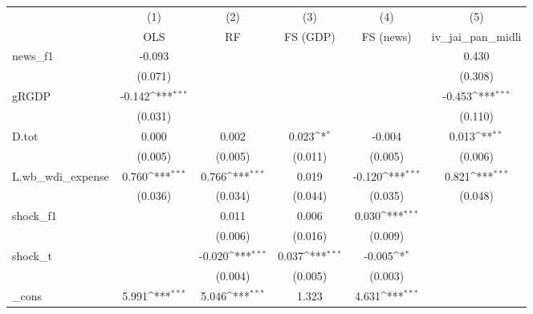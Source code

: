 {
\def\sym#1{\ifmmode^{#1}\else\(^{#1}\)\fi}
\begin{tabular}{l*{5}{c}}
\toprule
            &\multicolumn{1}{c}{(1)}&\multicolumn{1}{c}{(2)}&\multicolumn{1}{c}{(3)}&\multicolumn{1}{c}{(4)}&\multicolumn{1}{c}{(5)}\\
            &\multicolumn{1}{c}{OLS}&\multicolumn{1}{c}{RF}&\multicolumn{1}{c}{FS (GDP)}&\multicolumn{1}{c}{FS (news)}&\multicolumn{1}{c}{iv\_jai\_pan\_midli}\\
\midrule
news\_f1     &      -0.093         &                     &                     &                     &       0.430         \\
            &     (0.071)         &                     &                     &                     &     (0.308)         \\
\addlinespace
gRGDP       &      -0.142\sym{***}&                     &                     &                     &      -0.453\sym{***}\\
            &     (0.031)         &                     &                     &                     &     (0.110)         \\
\addlinespace
D.tot       &       0.000         &       0.002         &       0.023\sym{*}  &      -0.004         &       0.013\sym{**} \\
            &     (0.005)         &     (0.005)         &     (0.011)         &     (0.005)         &     (0.006)         \\
\addlinespace
L.wb\_wdi\_expense&       0.760\sym{***}&       0.766\sym{***}&       0.019         &      -0.120\sym{***}&       0.821\sym{***}\\
            &     (0.036)         &     (0.034)         &     (0.044)         &     (0.035)         &     (0.048)         \\
\addlinespace
shock\_f1    &                     &       0.011         &       0.006         &       0.030\sym{***}&                     \\
            &                     &     (0.006)         &     (0.016)         &     (0.009)         &                     \\
\addlinespace
shock\_t     &                     &      -0.020\sym{***}&       0.037\sym{***}&      -0.005\sym{*}  &                     \\
            &                     &     (0.004)         &     (0.005)         &     (0.003)         &                     \\
\addlinespace
\_cons      &       5.991\sym{***}&       5.046\sym{***}&       1.323         &       4.631\sym{***}&                     \\

\end{tabular}}
